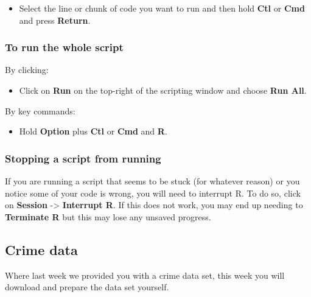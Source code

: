 \documentclass[
]{book}
\providecommand{\tightlist}{%
  \setlength{\itemsep}{0pt}\setlength{\parskip}{0pt}}
\begin{document}
\begin{itemize}
\tightlist
\item
  Select the line or chunk of code you want to run and then hold \textbf{Ctl} or \textbf{Cmd} and press \textbf{Return}.
\end{itemize}

\hypertarget{to-run-the-whole-script}{%
\subsubsection*{To run the whole script}\label{to-run-the-whole-script}}

By clicking:

\begin{itemize}
\tightlist
\item
  Click on \textbf{Run} on the top-right of the scripting window and choose \textbf{Run All}.
\end{itemize}

By key commands:

\begin{itemize}
\tightlist
\item
  Hold \textbf{Option} plus \textbf{Ctl} or \textbf{Cmd} and \textbf{R}.
\end{itemize}

\hypertarget{stopping-a-script-from-running}{%
\subsubsection*{Stopping a script from running}\label{stopping-a-script-from-running}}

If you are running a script that seems to be stuck (for whatever reason) or you notice some of your code is wrong, you will need to interrupt R. To do so, click on \textbf{Session} -\textgreater{} \textbf{Interrupt R}. If this does not work, you may end up needing to \textbf{Terminate R} but this may lose any unsaved progress.

\hypertarget{crime-data-2}{%
\subsection{Crime data}\label{crime-data-2}}

Where last week we provided you with a crime data set, this week you will download and prepare the data set yourself.
\end{document}
